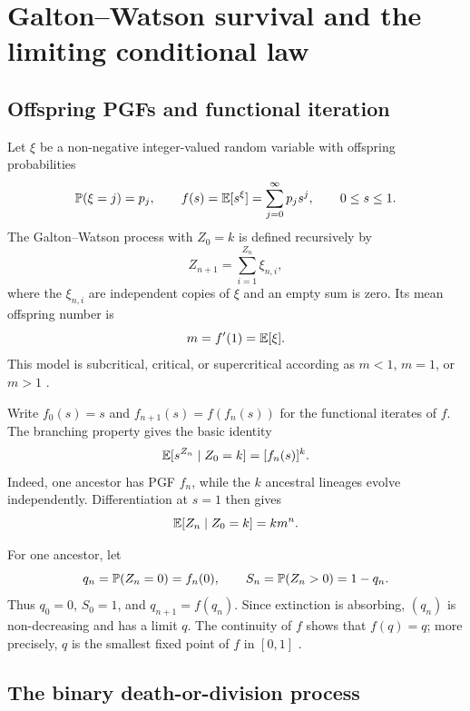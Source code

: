 \section{Galton--Watson survival and the limiting conditional law}
\label{sec:gw}

\subsection{Offspring PGFs and functional iteration}

Let $\xi$ be a non-negative integer-valued random variable with offspring probabilities
\begin{equation}
  \mathbb{P}(\xi=j)=p_j,
  \qquad
  f(s)=\mathbb{E}[s^\xi]=\sum_{j=0}^{\infty}p_j s^j,
  \qquad 0\le s\le 1.
  \label{eq:offspring-pgf}
\end{equation}
The Galton--Watson process with $Z_0=k$ is defined recursively by
\begin{equation}
  Z_{n+1}=\sum_{i=1}^{Z_n}\xi_{n,i},
  \label{eq:gw-definition}
\end{equation}
where the $\xi_{n,i}$ are independent copies of $\xi$ and an empty sum is zero.  Its mean offspring number is
\[
  m=f'(1)=\mathbb{E}[\xi].
\]
This model is subcritical, critical, or supercritical according as $m<1$, $m=1$, or $m>1$ \cite{Athreya1972}.

Write $f_0(s)=s$ and $f_{n+1}(s)=f(f_n(s))$ for the functional iterates of $f$.  The branching property gives the basic identity
\begin{equation}
  \mathbb{E}[s^{Z_n}\mid Z_0=k]=[f_n(s)]^k.
  \label{eq:iterated-pgf}
\end{equation}
Indeed, one ancestor has PGF $f_n$, while the $k$ ancestral lineages evolve independently.  Differentiation at $s=1$ then gives
\begin{equation}
  \mathbb{E}[Z_n\mid Z_0=k]=k m^n.
  \label{eq:gw-mean}
\end{equation}

For one ancestor, let
\begin{equation}
  q_n=\mathbb{P}(Z_n=0)=f_n(0),
  \qquad
  S_n=\mathbb{P}(Z_n>0)=1-q_n.
  \label{eq:survival-definitions}
\end{equation}
Thus $q_0=0$, $S_0=1$, and $q_{n+1}=f(q_n)$.  Since extinction is absorbing, $(q_n)$ is non-decreasing and has a limit $q$.  The continuity of $f$ shows that $f(q)=q$; more precisely, $q$ is the smallest fixed point of $f$ in $[0,1]$ \cite{Athreya1972}.

\subsection{The binary death-or-division process}
\label{sec:binary-gw}

